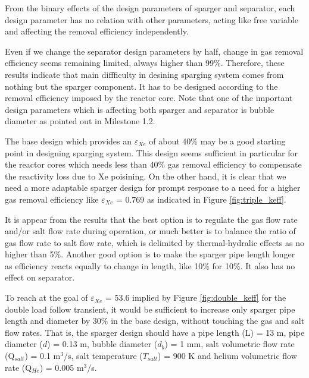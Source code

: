     From the binary effects of the design parameters of sparger and separator, each design parameter has no relation with other parameters, acting like free variable and affecting the removal efficiency independently.

    Even if we change the separator design parameters by half, change in gas
    removal efficiency seems remaining limited, always higher than 99\%.
    Therefore, these results indicate that main diffficulty in desining sparging
    system comes from nothing but the sparger component. It has to be designed
    according to the removal efficiency imposed by the reactor core. Note that one of the important design parameters which is affecting both sparger and
    separator is bubble diameter as pointed out in Milestone 1.2.

    The base design which provides an $\varepsilon$$_{Xe}$ of about
    40\% may be a good starting point in designing sparging system. This design
    seems sufficient in particular for the reactor cores which needs less than
    40\% gas removal efficiency to compensate the reactivity loss due to Xe
    poisining. On the other hand, it is clear that we need a more adaptable
    sparger design for prompt response to a need for a higher gas removal
    efficiency like $\varepsilon$$_{Xe}$ = 0.769 as indicated in Figure
    \ref{fig:triple_keff}.

     It is appear from the results that the best option is to regulate the gas
    flow rate and/or salt flow rate during operation, or much better is to
    balance the ratio of gas flow rate to salt flow rate, which is delimited by
    thermal-hydralic effects as no higher than 5\%. Another good option is to
    make the sparger pipe length longer as efficiency reacts equally to change
    in length, like 10\% for 10\%. It also has no effect on separator.

    To reach at the goal of $\varepsilon$$_{Xe}$ = 53.6 implied by Figure
    \ref{fig:double_keff} for the double load follow transient, it would be
    sufficient to increase only sparger pipe length and diameter by 30\% in the
    base design, without touching the gas and salt flow rates. That is, the
    sparger design should have a pipe length (L) = 13 m, pipe diameter ($d$) =
    0.13 m, bubble diameter ($d_b$) = 1 mm, salt volumetric flow rate
    (Q$_{salt}$) = 0.1 m$^{3}$/s, salt temperature ($T_{salt}$) = 900 K and
    helium volumetric flow rate (Q$_{He}$) = 0.005 m$^{3}$/s.

